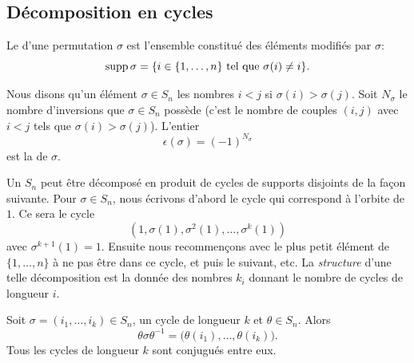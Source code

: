\subsection{Décomposition en cycles}

\begin{definition}      \label{DEFooSupportPermutation}
    Le  d'une permutation $\sigma$ est l'ensemble constitué des éléments modifiés par $\sigma$:
    \begin{equation*}
        \operatorname{supp} \sigma = \{ i \in \{1,\ldots,n \} \text{ tel que } \sigma(i) \neq i\}.
    \end{equation*}
\end{definition}

\begin{definition}  \label{DEFooWPYSooPWuwWO}
    Nous disons qu'un élément \( \sigma \in S_n\)  les nombres \( i<j\) si \( \sigma(i)>\sigma(j)\). Soit \( N_\sigma\) le nombre d'inversions que \( \sigma\in S_n\) possède (c'est le nombre de couples \( (i,j)\) avec \( i<j\) tels que \( \sigma(i)>\sigma(j)\)). L'entier
    \begin{equation}
        \epsilon(\sigma)=(-1)^{N_\sigma}
    \end{equation}
    est la  de \( \sigma\).
\end{definition}

Un  \( S_n\) peut être décomposé en produit de cycles de supports disjoints de la façon suivante. Pour \( \sigma \in S_n \), nous écrivons d'abord le cycle qui correspond à l'orbite de \( 1\). Ce sera le cycle
\begin{equation}
    (1,\sigma(1),\sigma^2(1),\ldots, \sigma^k(1))
\end{equation}
avec \( \sigma^{k+1}(1)=1\). Ensuite nous recommençons avec le plus petit élément de \( \{ 1,\ldots, n \}\) à ne pas être dans ce cycle, et puis le suivant, etc. La \emph{structure} d'une telle décomposition est la donnée des nombres \( k_i\) donnant le nombre de cycles de longueur \( i\).

\begin{lemma}        \label{LemmvZFWP}
    Soit \( \sigma=(i_1,\ldots, i_k)\in S_n\), un cycle de longueur \( k\) et \( \theta\in S_n\). Alors
    \begin{equation}
        \theta\sigma\theta^{-1}=\big( \theta(i_1),\ldots, \theta(i_k) \big).
    \end{equation}
    Tous les cycles de longueur \( k\) sont conjugués entre eux.
\end{lemma}

